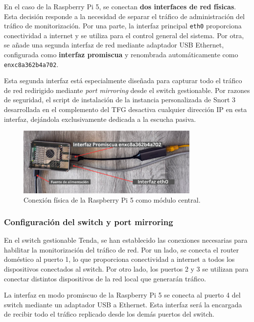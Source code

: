\documentclass[11pt,a4paper,twoside]{report}
\begin{document}
En el caso de la Raspberry Pi 5, se conectan \textbf{dos interfaces de red físicas}. Esta decisión responde a la necesidad de separar el tráfico de administración del tráfico de monitorización. Por una parte, la interfaz principal \texttt{eth0} proporciona conectividad a internet y se utiliza para el control general del sistema. Por otra, se añade una segunda interfaz de red mediante adaptador USB Ethernet, configurada como \textbf{interfaz promiscua} y renombrada automáticamente como \texttt{enxc8a362b4a702}.\newline

Esta segunda interfaz está especialmente diseñada para capturar todo el tráfico de red redirigido mediante \textit{port mirroring} desde el switch gestionable. Por razones de seguridad, el script de instalación de la instancia personalizada de Snort 3 desarrollada en el complemento del TFG desactiva cualquier dirección IP en esta interfaz, dejándola exclusivamente dedicada a la escucha pasiva.

\begin{figure}[H]
	\centering
	\includegraphics[width=0.8\textwidth]{install/0.1.png}
	\caption{Conexión física de la Raspberry Pi 5 como módulo central.}
	\label{fig:conexion-central-rpi5}
\end{figure}


\subsubsection{Configuración del switch y port mirroring}

En el switch gestionable Tenda, se han establecido las conexiones necesarias para habilitar la monitorización del tráfico de red. Por un lado, se conecta el router doméstico al puerto 1, lo que proporciona conectividad a internet a todos los dispositivos conectados al switch. Por otro lado, los puertos 2 y 3 se utilizan para conectar distintos dispositivos de la red local que generarán tráfico.\newline

La interfaz en modo promiscuo de la Raspberry Pi 5 se conecta al puerto 4 del switch mediante un adaptador USB a Ethernet. Esta interfaz será la encargada de recibir todo el tráfico replicado desde los demás puertos del switch.\newline
\end{document}
